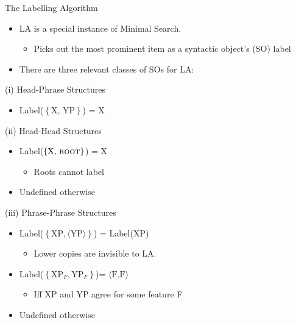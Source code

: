 \documentclass[Proposal]{subfiles}
\begin{document}
\begin{frame}
  {The Labelling Algorithm}
  {\textcite{chomsky2013problems,chomsky2015problems}}
  \begin{itemize}
    \item LA is a special instance of Minimal Search.
      \pause
      \begin{itemize}
	\item Picks out the most prominent item as a syntactic object's (SO) label
      \end{itemize}
      \pause
    \item There are three relevant classes of SOs for LA:
  \end{itemize}
  \begin{overprint}
    \begin{block}
      {(i) Head-Phrase Structures}
      \begin{itemize}[<+->]
        \item Label($\left\{ \text{X, YP} \right\}$) = X
      \end{itemize}
    \end{block}
    \begin{block}
      {(ii) Head-Head Structures}
      \begin{itemize}[<+->]
        \item Label($\left\{ \text{X, }\textsc{root} \right\}$) = X
          \begin{itemize}
            \item Roots cannot label
          \end{itemize}
        \item Undefined otherwise
      \end{itemize}
    \end{block}
    \begin{block}
      {(iii) Phrase-Phrase Structures}
      \begin{itemize}[<+->]
        \item Label($\left\{ \text{XP}, \langle\text{YP}\rangle \right\}$) = Label(XP)
          \begin{itemize}
            \item Lower copies are invisible to LA.
          \end{itemize}
        \item Label($\left\{ \text{XP}_F, \text{YP}_F \right\}$)= $\langle\text{F,F}\rangle$
          \begin{itemize}
            \item Iff XP and YP agree for some feature F
          \end{itemize}
        \item Undefined otherwise
      \end{itemize}
    \end{block}
  \end{overprint}
\end{frame}
\end{document}
